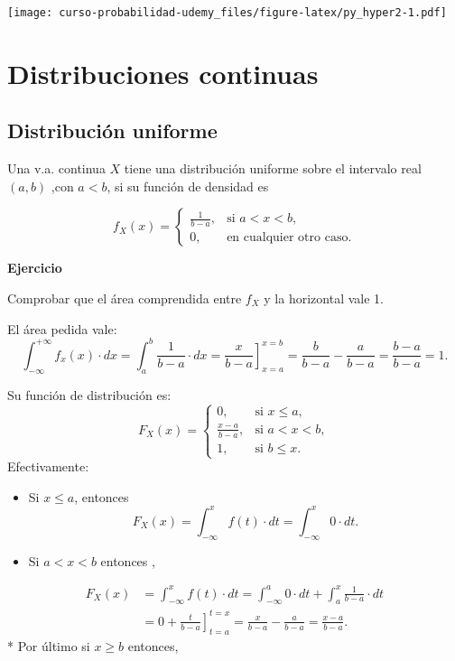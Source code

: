 \documentclass[]{book}
\providecommand{\tightlist}{%
  \setlength{\itemsep}{0pt}\setlength{\parskip}{0pt}}
\begin{document}
\texttt{[image: curso-probabilidad-udemy\_files/figure-latex/py\_hyper2-1.pdf]}

\hypertarget{distribuciones-continuas}{%
\section{Distribuciones continuas}\label{distribuciones-continuas}}

\hypertarget{distribuciuxf3n-uniforme}{%
\subsection{Distribución uniforme}\label{distribuciuxf3n-uniforme}}

Una v.a. continua \(X\) tiene una distribución uniforme sobre el intervalo real \((a,b)\) ,con \(a<b\), si su función de densidad es

\[
f_X(x)=\left\{\begin{array}{ll}
\frac1{b-a}, & \mbox{si } a<x<b,\\ 0,  & \mbox{en cualquier otro caso.}
\end{array}
\right. 
\]

\textbf{Ejercicio}

Comprobar que el área comprendida entre \(f_X\) y la horizontal
vale 1.

El área pedida vale:
\[
\int_{-\infty}^{+\infty} f_x(x)\cdot dx=\int_{a}^{b} \frac{1}{b-a} \cdot dx=\left.\frac{x}{b-a}\right]_{x=a}^{x=b}=\frac{b}{b-a}-\frac{a}{b-a}=
\frac{b-a}{b-a}=1.
\]

Su función de distribución es:
\[
F_X(x)=\left\{\begin{array}{ll} 0,  & \mbox{si } x\leq a,\\
\frac{x-a}{b-a}, & \mbox{si } a<x<b,\\ 1,  & \mbox{si } b\leq x.
\end{array}
\right. 
\]
Efectivamente:

\begin{itemize}
\tightlist
\item
  Si \(x\leq a\), entonces
  \[F_X(x)=\int_{-\infty}^{x} f(t)\cdot dt= \int_{-\infty}^{x} 0\cdot dt.\]
\item
  Si \(a<x<b\) entonces ,
\end{itemize}

\[
\begin{array}{rl}
F_X(x)&=\displaystyle\int_{-\infty}^{x} f(t)\cdot dt= \int_{-\infty}^{a} 0\cdot dt+\int_{a}^{x} \frac1{b-a} \cdot dt\\
&= \displaystyle 0 +\left.\frac{t}{b-a}\right]_{t=a}^{t=x}= \frac{x}{b-a}-\frac{a}{b-a}=\frac{x-a}{b-a}.
\end{array}
\]
* Por último si \(x\geq b\) entonces,
\end{document}
